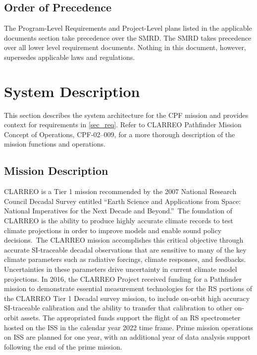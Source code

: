\documentclass[12pt,oneside,oldfontcommands]{memoir}
\begin{document}
\section{Order of Precedence }
\label{orderofprecedence}

The Program-Level Requirements and Project-Level plans listed in the applicable documents section take precedence over the \gls{SMRD}. The \gls{SMRD} takes precedence over all lower level requirement documents. Nothing in this document, however, supersedes applicable laws and regulations.

\chapter{System Description  }
\label{sec_desc}

This section describes the system architecture for the \gls{CPF} mission and provides context for requirements in \autoref{sec_req}. Refer to \gls{CLARREO} Pathfinder Mission Concept of Operations, \gls{CPF}-02--009, for a more thorough description of the mission functions and operations.

\section{Mission Description }
\label{missiondescription}

\gls{CLARREO} is a Tier 1 mission recommended by the 2007 National Research Council Decadal Survey entitled ``Earth Science and Applications from Space: National Imperatives for the Next Decade and Beyond.'' The foundation of \gls{CLARREO} is the ability to produce highly accurate climate records to \gls{test} climate projections in order to improve models and enable sound policy decisions. The \gls{CLARREO} mission accomplishes this critical objective through accurate \gls{SI}-traceable decadal observations that are sensitive to many of the key climate parameters such as radiative forcings, climate responses, and feedbacks. Uncertainties in these parameters drive uncertainty in current climate model projections. In 2016, the \gls{CLARREO} Project received funding for a Pathfinder mission to demonstrate essential \gls{measure}ment technologies for the \gls{RS} portions of the \gls{CLARREO} Tier 1 Decadal survey mission, to include on-orbit high accuracy \gls{SI}-traceable calibration and the ability to transfer that calibration to other on-orbit assets. The appropriated funds support the flight of an \gls{RS} spectrometer hosted on the \gls{ISS} in the calendar year 2022 time frame. Prime mission operations on \gls{ISS} are planned for one year, with an additional year of data \gls{analysis} support following the end of the prime mission.
\end{document}
